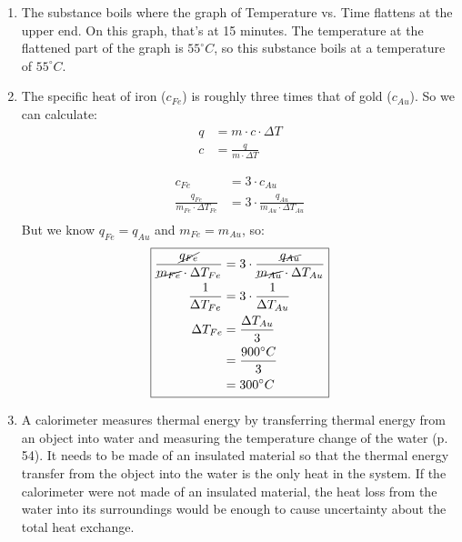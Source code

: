 \documentclass[11pt, oneside]{article}   	%
\begin{document}
\begin{enumerate}
\item The substance boils where the graph of Temperature vs. Time flattens at the upper end. On this graph, that's at 15 minutes. The temperature at the flattened part of the graph is $55^{\circ}C$, so this substance boils at a temperature of  $55^{\circ}C$.

\item The specific heat of iron ($c_{Fe}$) is roughly three times that of gold ($c_{Au}$). So we can calculate:
\begin{equation} 
\boxed{
\begin{split}
      q &= m \cdot c \cdot \Delta T \\
      c &= \frac{q}{m \cdot \Delta T} 
 \end{split}
 }
 \end{equation}
 
 \begin{equation} 
\boxed{
\begin{split}
      c_{Fe} &= 3 \cdot c_{Au} \\
      \frac{q_{Fe}}{m_{Fe} \cdot \Delta T_{Fe}}  &= 3 \cdot \frac{q_{Au}}{m_{Au} \cdot \Delta T_{Au}} \\
 \end{split}
 }
 \end{equation}
 But we know $q_{Fe} = q_{Au}$ and $m_{Fe} = m_{Au}$, so:\\
 
  \begin{equation} 
\boxed{
\begin{split}
      \frac{\cancel{q_{Fe}}}{\cancel{m_{Fe}} \cdot \Delta T_{Fe}}  &= 3 \cdot \frac{\cancel{q_{Au}}}{\cancel{m_{Au}} \cdot \Delta T_{Au}} \\
      \frac{1}{\Delta T_{Fe}} &= 3 \cdot \frac{1}{\Delta T_{Au}} \\
      \Delta T_{Fe} &= \frac{\Delta T_{Au}}{3} \\
                            &= \frac{900^{\circ}C}{3} \\
                            &= 300^{\circ}C
 \end{split}
 }
 \end{equation}
 
 \item A calorimeter measures thermal energy by transferring thermal energy from an object into water and measuring the temperature change of the water (p. 54). It needs to be made of an insulated material so that the thermal energy transfer from the object into the water is the only heat in the system. If the calorimeter were not made of an insulated material, the heat loss from the water into its surroundings would be enough to cause uncertainty about the total heat exchange.
 
\end{enumerate}
\end{document}
